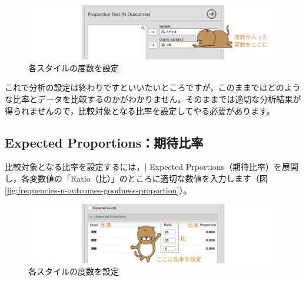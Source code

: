 \documentclass[
  12pt,
  a5jpaper,
  lualatex, ja=standard]{bxjsbook}
\begin{document}
\begin{figure}[!ht]

{\centering \includegraphics[width=1\linewidth]{images/frequencies/n-outcomes-goodness-set-count} 

}

\caption{各スタイルの度数を設定}\label{fig:frequencies-n-outcomes-goodness-set-count}
\end{figure}

これで分析の設定は終わりですといいたいところですが，このままではどのような比率とデータを比較するのかがわかりません。そのままでは適切な分析結果が得られませんので，比較対象となる比率を設定してやる必要があります。

\hypertarget{sub:frequencies-n-outcomes-expected-proportions}{%
\subsection{Expected Proportions：期待比率}\label{sub:frequencies-n-outcomes-expected-proportions}}

比較対象となる比率を設定するには，\colorbox{bar}{\textcolor{gmoji2}{| Expected Prportions}}（期待比率）を展開し，各変数値の「Ratio（比）」のところに適切な数値を入力します（図\ref{fig:frequencies-n-outcomes-goodness-proportion}）。

\begin{figure}[!ht]

{\centering \includegraphics[width=1\linewidth]{images/frequencies/n-outcomes-goodness-set-proportion} 

}

\caption{各スタイルの度数を設定}\label{fig:frequencies-n-outcomes-goodness-set-proportion}
\end{figure}
\end{document}
